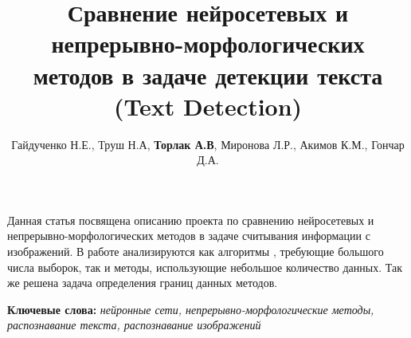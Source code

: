 \documentclass{article}
\begin{document}
\title{\textbf{Сравнение нейросетевых и непрерывно-морфологических методов в задаче детекции текста (Text Detection)}}
\author{Гайдученко Н.Е., Труш Н.А, \textbf{Торлак А.В}, Миронова Л.Р., Акимов К.М., Гончар Д.А.}
\maketitle
\Large
 Данная статья посвящена описанию проекта по сравнению нейросетевых и непрерывно-морфологических методов в задаче считывания информации с изображений. В работе анализируются как алгоритмы , требующие большого числа выборок, так и методы, использующие небольшое количество данных. Так же решена задача определения границ данных методов.

\bigskip\textbf{Ключевые слова:} \textit{нейронные сети, непрерывно-морфологические методы, распознавание текста, распознавание изображений}
\end{document}
